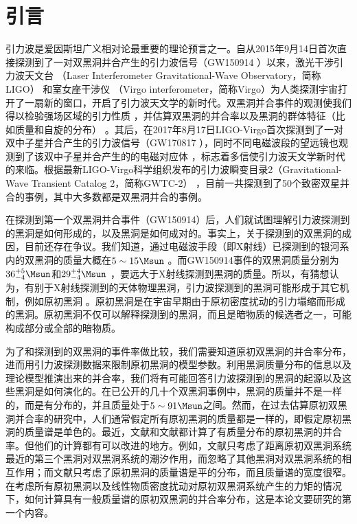 \chapter{引言}\label{chap:introduction}

引力波是爱因斯坦广义相对论最重要的理论预言之一。自从2015年9月14日首次直接探测到了一对双黑洞并合产生的引力波信号（GW150914 \citep{Abbott:2016blz}）以来，激光干涉引力波天文台 \citep{TheLIGOScientific:2014jea}（Laser Interferometer Gravitational-Wave Observatory，简称LIGO） 和室女座干涉仪 \citep{TheVirgo:2014hva}（Virgo interferometer，简称Virgo）为人类探测宇宙打开了一扇新的窗口，开启了引力波天文学的新时代。双黑洞并合事件的观测使我们得以检验强场区域的引力性质 \citep{TheLIGOScientific:2016src,LIGOScientific:2019fpa}，并估算双黑洞的并合率以及黑洞的群体特征（比如质量和自旋的分布） \citep{LIGOScientific:2018jsj,Abbott:2020gyp}。其后，在2017年8月17日LIGO-Virgo首次探测到了一对双中子星并合产生的引力波信号（GW170817 \citep{TheLIGOScientific:2017qsa}），同时不同电磁波段的望远镜也观测到了该双中子星并合产生的的电磁对应体 \citep{Monitor:2017mdv,GBM:2017lvd}，标志着多信使引力波天文学新时代的来临。根据最新LIGO-Virgo科学组织发布的引力波瞬变目录2（Gravitational-Wave Transient Catalog 2，简称GWTC-2） \citep{Abbott:2020niy}，目前一共探测到了50个致密双星并合的事例，其中大多数都是双黑洞并合的事例。

在\lvc 探测到第一个双黑洞并合事件（GW150914\citep{Abbott:2016blz}）后，人们就试图理解引力波探测到的黑洞是如何形成的，以及黑洞是如何成对的。事实上，关于\lvc 探测到的双黑洞的成因，目前还存在争议。我们知道，通过电磁波手段（即X射线）已探测到的银河系内的双黑洞的质量大概在$5\sim 15\Msun$ \citep{Remillard:2006fc}。而GW150914事件的双黑洞质量分别为$36^{+5}_{-4}\Msun$和$29^{+4}_{-4}\Msun$ \citep{Abbott:2016blz}，要远大于X射线探测到黑洞的质量。所以，有猜想认为，有别于X射线探测到的天体物理黑洞，引力波探测到的黑洞可能形成于其它机制，例如原初黑洞 \citep{Bird:2016dcv,Sasaki:2016jop,Chen:2018czv,Clesse:2017bsw}。原初黑洞是在宇宙早期由于原初密度扰动的引力塌缩而形成的黑洞\citep{Hawking:1971ei,Carr:1974nx,Khlopov:2008qy,Sasaki:2018dmp}。原初黑洞不仅可以解释\lvc 探测到的黑洞，而且是暗物质的候选者之一，可能构成部分或全部的暗物质。


为了和\lvc 探测到的双黑洞的事件率做比较，我们需要知道原初双黑洞的并合率分布，进而用引力波探测数据来限制原初黑洞的模型参数。利用黑洞质量分布的信息以及理论模型推演出来的并合率，我们将有可能回答引力波探测到的黑洞的起源以及这些黑洞是如何演化的。在\lvc 已公开的几十个双黑洞事例中，黑洞的质量并不是一样的，而是有分布的，并且质量处于$5\sim 91\Msun$之间\citep{Abbott:2020niy}。然而，在过去估算原初双黑洞并合率的研究中，人们通常假定所有原初黑洞的质量都是一样的，即假定原初黑洞的质量谱是单色的\citep{Sasaki:2016jop,Nakamura:1997sm,Ali-Haimoud:2017rtz,Bird:2016dcv,Nishikawa:2017chy}。最近，文献\citep{Raidal:2017mfl}和文献\citep{Kocsis:2017yty}都计算了有质量分布的原初黑洞的并合率。但他们的计算都有可以改进的地方。例如，文献\citep{Raidal:2017mfl}只考虑了距离原初双黑洞系统最近的第三个黑洞对双黑洞系统的潮汐作用，而忽略了其他黑洞对双黑洞系统的相互作用；而文献\citep{Kocsis:2017yty}只考虑了原初黑洞的质量谱是平的分布，而且质量谱的宽度很窄。在考虑所有原初黑洞以及线性物质密度扰动对原初双黑洞系统产生的力矩的情况下，如何计算具有一般质量谱的原初双黑洞的并合率分布，这是本论文要研究的第一个内容。

